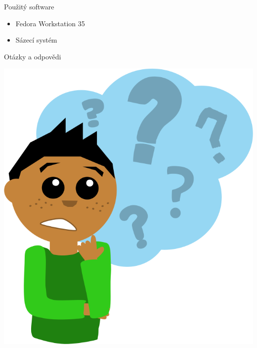 \documentclass[11pt]{beamer}
\begin{document}
 \begin{frame}{Použitý software}
			\begin{itemize}
				\item Fedora Workstation 35
				\item Sázecí systém \LaTeXe
			\end{itemize}
\end{frame}

\begin{frame}{Otázky a odpovědi}
	\begin{center}
		\includegraphics[width=\textheight]{images/questions.png}
	\end{center}
\end{frame}
\end{document}
